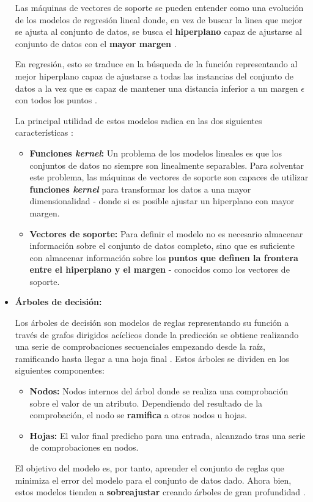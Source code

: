 \begin{itemize}[leftmargin=*, parsep=2pt, itemsep=2pt, topsep=4pt]
	Las máquinas de vectores de soporte se pueden entender como una evolución de los modelos de regresión lineal donde, en vez de buscar la linea que mejor se ajusta al conjunto de datos, se busca el \textbf{hiperplano} capaz de ajustarse al conjunto de datos con el \textbf{mayor margen} \cite{aima}. 
	
	En regresión, esto se traduce en la búsqueda de la función representando al mejor hiperplano capaz de ajustarse a todas las instancias del conjunto de datos a la vez que es capaz de mantener una distancia inferior a un margen $\epsilon$ con todos los puntos \cite{svr}.
	
	La principal utilidad de estos modelos radica en las dos siguientes características \cite{aima}:
	\begin{itemize}[parsep=1pt, itemsep=1pt, topsep=4pt]
		\item \textbf{Funciones \textit{kernel}:} Un problema de los modelos lineales es que los conjuntos de datos no siempre son linealmente separables. Para solventar este problema, las máquinas de vectores de soporte son capaces de utilizar \textbf{funciones \textit{kernel}} para transformar los datos a una mayor dimensionalidad - donde si es posible ajustar un hiperplano con mayor margen.
		\item \textbf{Vectores de soporte:} Para definir el modelo no es necesario almacenar información sobre el conjunto de datos completo, sino que es suficiente con almacenar información sobre los \textbf{puntos que definen la frontera entre el hiperplano y el margen} - conocidos como los vectores de soporte.
	\end{itemize}

	\item \textbf{Árboles de decisión:} 
	
	Los árboles de decisión son modelos de reglas representando su función a través de grafos dirigidos acíclicos \cite{Burkov2019TheHM} donde la predicción se obtiene realizando una serie de comprobaciones secuenciales empezando desde la raíz, ramificando hasta llegar a una hoja final \cite{aima}. Estos árboles se dividen en los siguientes componentes:
	
	\begin{itemize}[parsep=1pt, itemsep=1pt, topsep=4pt]
		\item \textbf{Nodos:} Nodos internos del árbol donde se realiza una comprobación sobre el valor de un atributo. Dependiendo del resultado de la comprobación, el nodo se \textbf{ramifica} a otros nodos u hojas.
		\item \textbf{Hojas:} El valor final predicho para una entrada, alcanzado tras una serie de comprobaciones en nodos.
	\end{itemize}
	
	El objetivo del modelo es, por tanto, aprender el conjunto de reglas que minimiza el error del modelo para el conjunto de datos dado. Ahora bien, estos modelos tienden a \textbf{sobreajustar} creando árboles de gran profundidad \cite{aima}.

\end{itemize}

